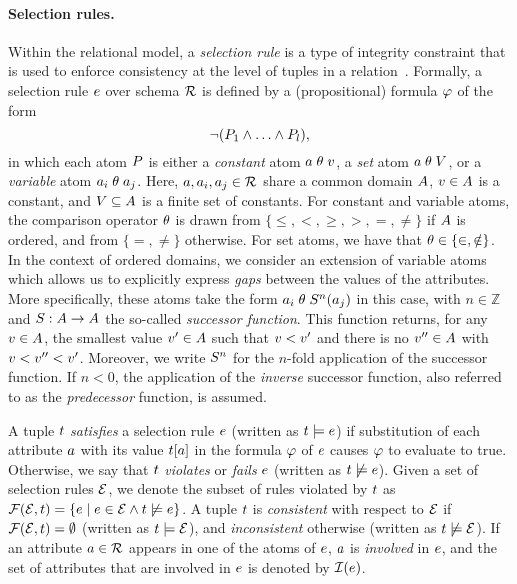 \paragraph{Selection rules.}
Within the relational model, a \emph{selection rule} is a type of integrity constraint that is used to enforce consistency at the level of tuples in a relation~\cite{Boeckling2022b,Boeckling2022a,Bronselaer2023}.
Formally, a selection rule $e$ over schema $\mathcal{R}$ is defined by a (propositional) formula $\varphi$ of the form
\begin{equation}
    \label{eq:sruleform}
    \neg (P_{1} \wedge \ldots \wedge P_{l}),
\end{equation}
in which each atom $P$ is either a \emph{constant} atom $a\;\theta\;v$, a \emph{set} atom $a\;\theta\;V$, or a \emph{variable} atom $a_{i}\;\theta\;a_{j}$.
Here, $a, a_{i}, a_{j} \in \mathcal{R}$ share a common domain $A$, $v \in A$ is a constant, and $V \subseteq A$ is a finite set of constants.
For constant and variable atoms, the comparison operator $\theta$ is drawn from $\{\leq, <, \geq, >, =, \neq\}$ if $A$ is ordered, and from $\{=, \neq\}$ otherwise.
For set atoms, we have that $\theta \in \{\in, \notin\}$.
In the context of ordered domains, we consider an extension of variable atoms which allows us to explicitly express \emph{gaps} between the values of the attributes.
More specifically, these atoms take the form $a_{i}\;\theta\; S^{n}(a_{j})$ in this case, with $n \in \mathbb{Z}$ and $S: A \rightarrow A$ the so-called \emph{successor function}.
This function returns, for any $v \in A$, the smallest value $v' \in A$ such that $v < v'$ and there is no $v'' \in A$ with $v < v'' < v'$.
Moreover, we write $S^{n}$ for the $n$-fold application of the successor function.
If $n < 0$, the application of the \emph{inverse} successor function, also referred to as the \emph{predecessor} function, is assumed.

A tuple $t$ \emph{satisfies} a selection rule $e$ (written as $t \models e$) if substitution of each attribute $a$ with its value $t[a]$ in the formula $\varphi$ of $e$ causes $\varphi$ to evaluate to true.
Otherwise, we say that $t$ \emph{violates} or \emph{fails} $e$ (written as $t \not\models e$).
Given a set of selection rules $\mathcal{E}$, we denote the subset of rules violated by $t$ as $\mathcal{F}(\mathcal{E}, t) = \{e \mid e \in \mathcal{E} \wedge t \not\models e\}$.
A tuple $t$ is \emph{consistent} with respect to $\mathcal{E}$ if $\mathcal{F}(\mathcal{E}, t) = \emptyset$ (written as $t \models \mathcal{E}$), and \emph{inconsistent} otherwise (written as $t \not\models \mathcal{E}$).
If an attribute $a \in \mathcal{R}$ appears in one of the atoms of  $e$, $a$ is \emph{involved} in $e$, and the set of attributes that are involved in $e$ is denoted by $\mathcal{I}(e)$.

